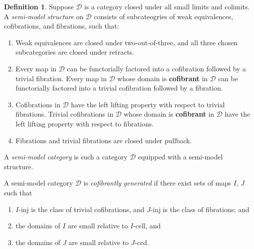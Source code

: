 \documentclass[a4paper,10pt
,draft
]{article}%
\numberwithin{equation}{section}
\numberwithin{figure}{section}
\theoremstyle{definition} %
\newtheorem{definition}[equation]{Definition}%
\newcommand{\1}{\ensuremath{\mathbbm 1}}%
\begin{document}
\begin{definition}
      Suppose $\mathcal D$ is a category closed under all small limits and colimits.
      A \textit{semi-model structure} on $\mathcal D$ consists of
      subcateogries of weak equivalences, cofibrations, and fibrations, such that:
      \begin{enumerate}[label = (\roman*)]
      \item Weak equivalences are closed under two-out-of-three, and all three chosen subcategories are closed under retracts.
      \item Every map in $\mathcal D$ can be functorially factored into a cofibration followed by a trivial fibration.
            Every map in $\mathcal D$ whose domain is \textbf{cofibrant} in $\mathcal D$ can be functorially factored into a trivial cofibration followed by a fibration.
      \item Cofibrations in $\mathcal D$ have the left lifting property with respect to trivial fibrations.
            Trivial cofibrations in $\mathcal D$ whose domain is \textbf{cofibrant} in $\mathcal D$ have the left lifting property with respect to fibrations.
      \item Fibrations and trivial fibrations are closed under pullback.
      \end{enumerate}

      A \textit{semi-model category} is such a category $\mathcal D$ equipped with a semi-model structure.

      A semi-model category $\mathcal D$ is \textit{cofibrantly generated} if there exist sets of maps $ I$, $ J$ such that
      \begin{enumerate}[label = (\roman*)]
      \item $ I$-inj is the class of trivial cofibrations, and $ J$-inj is the class of fibrations; and
      \item the domains of $ I$ are small relative to $ I$-cell, and
      \item the domains of $ J$ are small relative to $ J$-ccd.
      \end{enumerate}
\end{definition}
\end{document}
